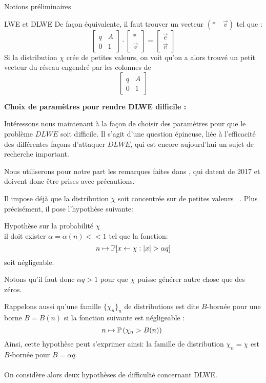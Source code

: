 \begin{section}{Notions préliminaires}
\begin{subsection}{LWE et DLWE}
	De façon équivalente, il faut trouver un vecteur $(*\quad\vec{v})$ tel que :
	\[ \begin{bmatrix}q & A \\ 0 &1 \end{bmatrix}\cdot
	   \begin{bmatrix}* \\ \vec{v} \end{bmatrix} =
	   \begin{bmatrix} \vec{e} \\ \vec{v} \end{bmatrix} \]
	Si la distribution $\chi$ crée de petites valeurs, on voit qu'on a alors trouvé un \og petit \fg~ vecteur du réseau engendré par les colonnes de 
	\[ \begin{bmatrix}q & A \\ 0 &1 \end{bmatrix} \]

	\textbf{Choix de paramètres pour rendre DLWE difficile :}

	Intéressons nous maintenant à la façon de choisir des paramètres
	pour que le problème $DLWE$ soit difficile. Il s'agit d'une question épineuse, 
	liée à l'efficacité des différentes façons d'attaquer $DLWE$, qui est encore aujourd'hui
	un sujet de recherche important.

	Nous utiliserons pour notre part les remarques faites dans \cite{halevi}, qui datent de 
	2017 et doivent donc être prises avec précautions. 

	Il impose déjà que la distribution $\chi$ soit \og concentrée sur de
	petites valeurs \fg~. Plus précisément, il pose l'hypothèse suivante: 
	\begin{hyp}{Hypothèse sur la probabilité $\chi$}\\ \label{hyp:proba}
	il doit exister $\alpha = \alpha(n) <\!\!\!< 1$ tel que la fonction:
	\[ n \mapsto \mathbb{P} [x \leftarrow \chi : |x| > \alpha q]\]
	soit négligeable.
	\end{hyp}
	Notons qu'il faut donc $\alpha q > 1$ pour que $\chi$ puisse générer autre chose 
	que des zéros. 

	Rappelons aussi qu'une famille $\{\chi_n\}_n$ de distributions est dite $B$-bornée pour une borne $B = B(n)$ si
	la fonction suivante est négligeable : 
	\[n \mapsto \PP\left(\chi_n > B(n)\right) \] 
	Ainsi, cette hypothèse peut s'exprimer ainsi: la famille de distribution $\chi_n = \chi$ est $B$-bornée pour $B
	= \alpha q$.


	\paragraph{}
	On considère alors deux hypothèses de difficulté 
	concernant DLWE. 


\end{subsection}
\end{section}
